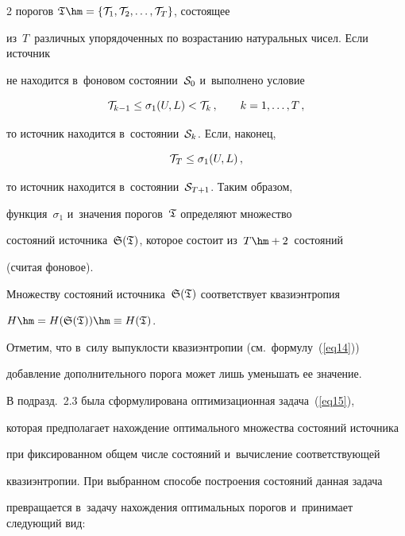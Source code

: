 \begin{multicols}{2}
порогов ${\frak T}\hm=\{{\cal T}_1,{\cal T}_2,\dots,{\cal T}_T \}$, состоящее 

из~$T$~различных упорядочен\-ных по возрастанию натуральных чисел. Если источник 

не находится в~фоновом состоянии~${\cal S}_0$ и~выполнено условие

\begin{equation}

\label{eq23}

{\cal T}_{k-1} \leq \sigma_1(U,L) < {\cal T}_{k}\,, \qquad k=1,\dots,T\,,

\end{equation}

то источник находится в~состоянии~${\cal S}_k$. Если, наконец,

\begin{equation}

\label{eq24}

{\cal T}_{T} \leq \sigma_1(U,L)\,,

\end{equation}

то источник находится в~состоянии~${\cal S}_{T+1}$. Таким образом, 

функция~$\sigma_1$ и~значения порогов~$\frak T$ определяют множество 

состояний источника~${\frak S}({\frak T})$, которое состоит из~$T\hm+2$~состояний 

(считая фоновое).



Множеству состояний источника~${\frak S}(\frak T)$ соответствует квазиэнтропия 

$H\hm=H({\frak S}({\frak T}))\hm\equiv H({\frak T})$. 

Отметим, что в~силу выпуклости квазиэнтропии (см.\ формулу~(\ref{eq14})) 

добавление дополнительного порога может лишь уменьшать ее значение.



В подразд.~2.3 была сформулирована оптимизационная задача~(\ref{eq15}), 

которая предполагает нахож\-де\-ние оптимального множества со\-сто\-яний источника 

при фиксированном общем числе со\-сто\-яний и~вычисление соответствующей 

квазиэнтропии. При выбранном способе построения со\-сто\-яний данная задача 

превращается в~задачу нахождения оптимальных порогов и~принимает следующий вид:


\end{multicols}
